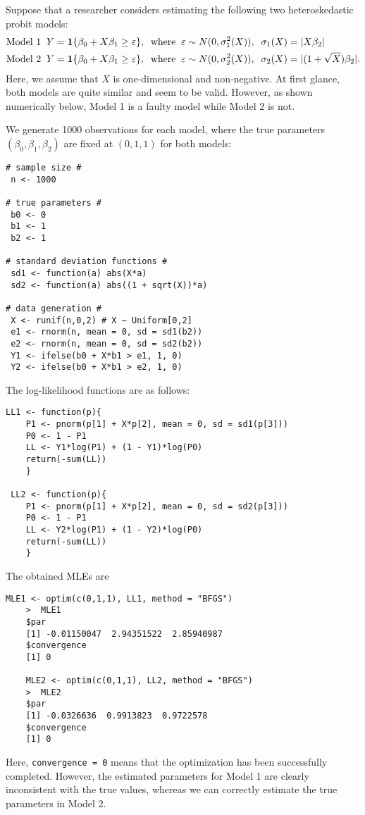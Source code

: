 \documentclass[11pt, A4paper, openany, uplatex]{book}
\begin{document}
Suppose that a researcher considers estimating the following two heteroskedastic probit models:
\begin{align*}
	\text{Model 1} & \;\; Y = \mathbf{1}\{\beta_0 + X \beta_1 \ge \varepsilon\}, \;\; \text{where} \;\; \varepsilon \sim N(0, \sigma^2_1(X)), \;\; \sigma_1(X) = |X\beta_2| \\
	\text{Model 2} & \;\; Y = \mathbf{1}\{\beta_0 + X \beta_1 \ge \varepsilon\}, \;\; \text{where} \;\; \varepsilon \sim N(0, \sigma^2_2(X)), \;\; \sigma_2(X) = |(1 + \sqrt{X})\beta_2|.
\end{align*}
Here, we assume that $X$ is one-dimensional and non-negative.
At first glance, both models are quite similar and seem to be valid.
However, as shown numerically below, Model 1 is a faulty model while Model 2 is not.

We generate 1000 observations for each model, where the true parameters $(\beta_0,\beta_1,\beta_2)$ are fixed at $(0,1,1)$ for both models:
\begin{lstlisting}[basicstyle=\ttfamily\footnotesize, frame=single]
# sample size #
 n <- 1000

# true parameters #
 b0 <- 0
 b1 <- 1
 b2 <- 1

# standard deviation functions #
 sd1 <- function(a) abs(X*a)
 sd2 <- function(a) abs((1 + sqrt(X))*a)

# data generation #
 X <- runif(n,0,2) # X ~ Uniform[0,2]
 e1 <- rnorm(n, mean = 0, sd = sd1(b2))
 e2 <- rnorm(n, mean = 0, sd = sd2(b2))
 Y1 <- ifelse(b0 + X*b1 > e1, 1, 0)
 Y2 <- ifelse(b0 + X*b1 > e2, 1, 0)
\end{lstlisting}
The log-likelihood functions are as follows:
\begin{lstlisting}[basicstyle=\ttfamily\footnotesize, frame=single]
 LL1 <- function(p){
	P1 <- pnorm(p[1] + X*p[2], mean = 0, sd = sd1(p[3]))
	P0 <- 1 - P1
	LL <- Y1*log(P1) + (1 - Y1)*log(P0)
	return(-sum(LL))
	}

 LL2 <- function(p){
	P1 <- pnorm(p[1] + X*p[2], mean = 0, sd = sd2(p[3]))
	P0 <- 1 - P1
	LL <- Y2*log(P1) + (1 - Y2)*log(P0)
	return(-sum(LL))
	}
\end{lstlisting}
The obtained MLEs are
\begin{lstlisting}[basicstyle=\ttfamily\footnotesize, frame=single]
	MLE1 <- optim(c(0,1,1), LL1, method = "BFGS")
	>  MLE1
	$par
	[1] -0.01150047  2.94351522  2.85940987
	$convergence
	[1] 0 

	MLE2 <- optim(c(0,1,1), LL2, method = "BFGS")
	>  MLE2
	$par
	[1] -0.0326636  0.9913823  0.9722578
	$convergence
	[1] 0
\end{lstlisting}
Here, \texttt{convergence = 0} means that the optimization has been successfully completed.
However, the estimated parameters for Model 1 are clearly inconsistent with the true values, whereas we can correctly estimate the true parameters in Model 2.
\end{document}
